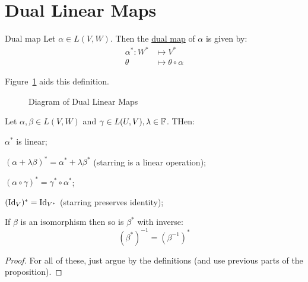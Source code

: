 \documentclass[../Main.tex]{subfiles}
\begin{document}
\section{Dual Linear Maps}
\begin{definition}{Dual map}
    Let $\alpha \in L(V, W)$. Then the \underline{dual map} of $\alpha$ is given by:
    \begin{align*}
        \alpha^* : W^* &\mapsto V^*\\
        \theta &\mapsto \theta \circ \alpha
    \end{align*}
\end{definition}
Figure~\ref{figDLMDiagram} aids this definition.
\begin{figure}
    \centering
    \caption{Diagram of Dual Linear Maps}
    \label{figDLMDiagram}
\end{figure}
\begin{propositions}{
        Let $\alpha, \beta \in L(V, W)$ and $\gamma \in L(U, V), \lambda \in \mathbb{F}$. THen:
        \label{propsDLMProps}
    }
    \item $\alpha^*$ is linear;
    \item $(\alpha + \lambda \beta)^* = \alpha^* + \lambda \beta^*$ (starring is a linear operation);
    \item $(\alpha \circ \gamma)^* = \gamma^* \circ \alpha^*$;
    \item $(\operatorname{Id}_V)^* = \operatorname{Id}_{V^*}$ (starring preserves identity);
    \item If $\beta$ is an isomorphism then so is $\beta^*$ with inverse:
        \begin{equation*}
            (\beta^*)^{-1} = (\beta^{-1})^*
        \end{equation*}
\end{propositions}
\begin{proof}
    For all of these, just argue by the definitions (and use previous parts of the proposition).
\end{proof}
\end{document}
